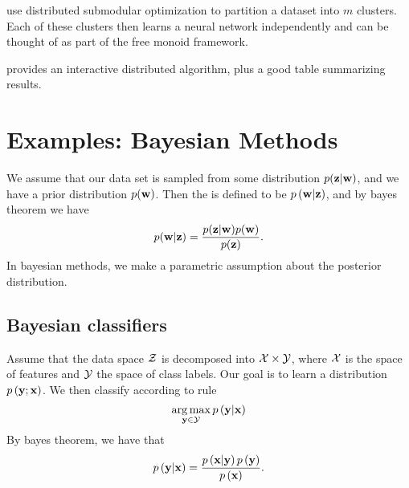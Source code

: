 \documentclass[thesis.tex]{subfiles}
\newcommand{\p}[1]{p\left({#1}\right)}
\begin{document}
\cite{qi2016robust} use distributed submodular optimization to partition a dataset into $m$ clusters.
Each of these clusters then learns a neural network independently and can be thought of as part of the free monoid framework.

\cite{lucic2016horizontally} provides an interactive distributed algorithm,
plus a good table summarizing results.


\section{Examples: Bayesian Methods}

We assume that our data set is sampled from some distribution $p(\mathbf z|\mathbf w)$,
and we have a prior distribution $p(\mathbf w)$.
Then the  is defined to be $\p{\w|\z}$,
and by bayes theorem we have
\begin{equation}
    p(\mathbf w | \mathbf z) = \frac{p(\mathbf z|\mathbf w)p(\mathbf w)}{p(\mathbf z)}
    .
\end{equation}
In bayesian methods, we make a parametric assumption about the posterior distribution.



\subsection{Bayesian classifiers}

Assume that the data space ${\mathcal Z}$ is decomposed into $\mathcal{X}\times \mathcal{Y}$,
where $\mathcal{X}$ is the space of features and $\mathcal{Y}$ the space of class labels.
Our goal is to learn a distribution $\p{\y ; \x}$.
We then classify according to rule
\begin{equation}
    \argmax_{\y\in\Y} \p{\y | \x}
    \end{equation}
By bayes theorem, we have that
\begin{equation}
    \p{\y | \x} = \frac{\p{\x | \y}\p{\y}}{\p{\x}}
    .
\end{equation}
\end{document}
